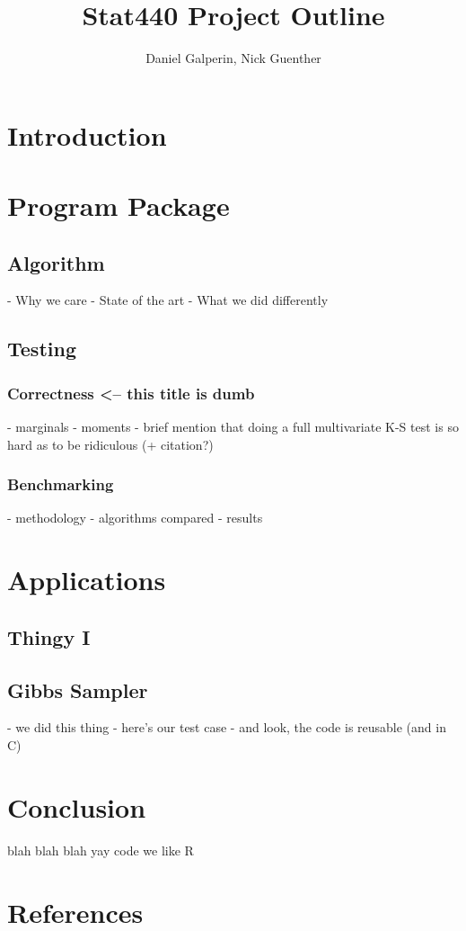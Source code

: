 \documentclass[english]{report}
\begin{document}
\title{Stat440 Project Outline}
\author{Daniel Galperin, Nick Guenther}
\date{} %


\maketitle

\section*{Introduction}

\section*{Program Package}

\subsection*{Algorithm}

- Why we care
- State of the art
- What we did differently

\subsection*{Testing}

\subsubsection*{Correctness <-- this title is dumb}

- marginals
- moments
- brief mention that doing a full multivariate K-S test is so hard as to be ridiculous (+ citation?)

\subsubsection*{Benchmarking}

- methodology
- algorithms compared
- results

\section*{Applications}

\subsection*{Thingy I}

\subsection*{Gibbs Sampler}

- we did this thing
- here's our test case
- and look, the code is reusable (and in C)

\section*{Conclusion}

blah blah blah yay code we like R


\section*{References}
\end{document}

